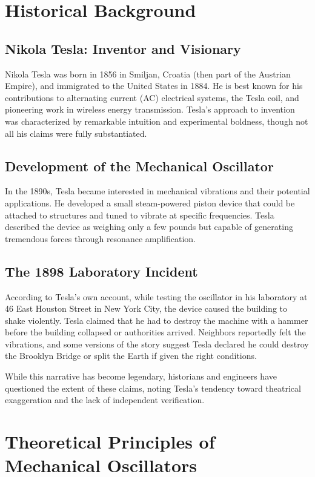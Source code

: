 \documentclass[12pt,a4paper]{article}
\begin{document}
\section*{Historical Background}

\subsection*{Nikola Tesla: Inventor and Visionary}
Nikola Tesla was born in 1856 in Smiljan, Croatia (then part of the Austrian Empire), and immigrated to the United States in 1884. He is best known for his contributions to alternating current (AC) electrical systems, the Tesla coil, and pioneering work in wireless energy transmission. Tesla's approach to invention was characterized by remarkable intuition and experimental boldness, though not all his claims were fully substantiated.

\subsection*{Development of the Mechanical Oscillator}
In the 1890s, Tesla became interested in mechanical vibrations and their potential applications. He developed a small steam-powered piston device that could be attached to structures and tuned to vibrate at specific frequencies. Tesla described the device as weighing only a few pounds but capable of generating tremendous forces through resonance amplification.

\subsection*{The 1898 Laboratory Incident}
According to Tesla's own account, while testing the oscillator in his laboratory at 46 East Houston Street in New York City, the device caused the building to shake violently. Tesla claimed that he had to destroy the machine with a hammer before the building collapsed or authorities arrived. Neighbors reportedly felt the vibrations, and some versions of the story suggest Tesla declared he could destroy the Brooklyn Bridge or split the Earth if given the right conditions.

While this narrative has become legendary, historians and engineers have questioned the extent of these claims, noting Tesla's tendency toward theatrical exaggeration and the lack of independent verification.

\section*{Theoretical Principles of Mechanical Oscillators}
\end{document}
